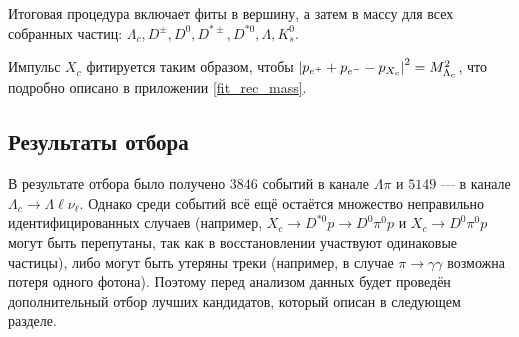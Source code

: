 Итоговая процедура включает фиты в вершину, а затем в массу для всех собранных частиц: $\Lambda_c, D^{\pm}, D^0, D^{*\pm}, D^{*0}, \Lambda, K_s^0$.

\newdot Импульс $X_c$ фитируется таким образом, чтобы $\abs{p_{e^+} + p_{e^-} - p_{X_c}}^2 = M^2_{\Lambda_c}$, что подробно описано в приложении \ref{fit_rec_mass}.

\subsection{Результаты отбора}

В результате отбора было получено $3846$ событий в канале $\Lambda \pi$ и $5149$ --- в канале $\Lambda_c \to \Lambda \ell \nu_\ell$. Однако среди событий всё ещё остаётся множество неправильно идентифицированных случаев (например, $X_c \to D^{*0} p \to D^0 \pi^0 p$ и $X_c \to D^0 \pi^0 p$ могут быть перепутаны, так как в восстановлении участвуют одинаковые частицы), либо могут быть утеряны треки (например, в случае $\pi \to \gamma \gamma$ возможна потеря одного фотона). Поэтому перед анализом данных будет проведён дополнительный отбор лучших кандидатов, который описан в следующем разделе. 

